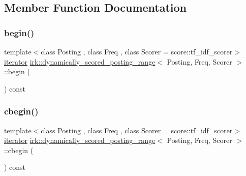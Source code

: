 \subsection{Member Function Documentation}
\mbox{\label{classirk_1_1dynamically__scored__posting__range_a984ac75ae00f56ec53c2676e57259aa6}} 
\subsubsection{\texorpdfstring{begin()}{begin()}}
{\footnotesize\ttfamily template$<$class Posting , class Freq , class Scorer  = score\+::tf\+\_\+idf\+\_\+scorer$>$ \\
\mbox{\hyperlink{classirk_1_1dynamically__scored__posting__range_1_1iterator}{iterator}} \mbox{\hyperlink{classirk_1_1dynamically__scored__posting__range}{irk\+::dynamically\+\_\+scored\+\_\+posting\+\_\+range}}$<$ Posting, Freq, Scorer $>$\+::begin (\begin{DoxyParamCaption}{ }\end{DoxyParamCaption}) const\hspace{0.3cm}{\ttfamily [inline]}}

\mbox{\label{classirk_1_1dynamically__scored__posting__range_ab21e42d5ffecd277777253dcb0a2d6f9}} 
\subsubsection{\texorpdfstring{cbegin()}{cbegin()}}
{\footnotesize\ttfamily template$<$class Posting , class Freq , class Scorer  = score\+::tf\+\_\+idf\+\_\+scorer$>$ \\
\mbox{\hyperlink{classirk_1_1dynamically__scored__posting__range_1_1iterator}{iterator}} \mbox{\hyperlink{classirk_1_1dynamically__scored__posting__range}{irk\+::dynamically\+\_\+scored\+\_\+posting\+\_\+range}}$<$ Posting, Freq, Scorer $>$\+::cbegin (\begin{DoxyParamCaption}{ }\end{DoxyParamCaption}) const\hspace{0.3cm}{\ttfamily [inline]}}

